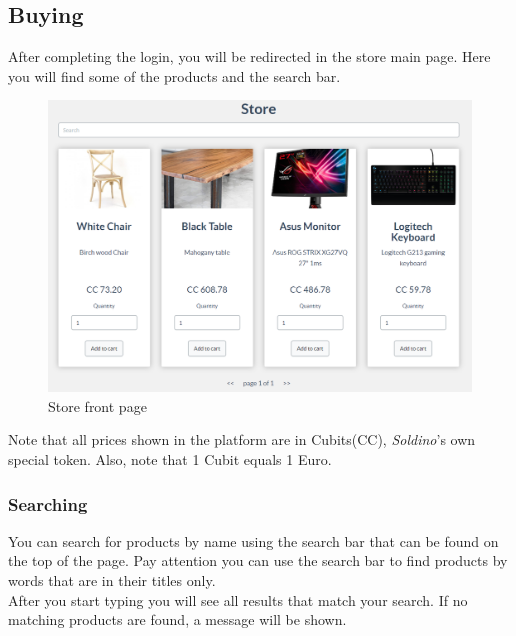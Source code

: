 	\subsection{Buying}
	After completing the login, you will be redirected in the store main page. 
	Here you will find some of the products and the search bar.
	\begin{figure}[H]
		\includegraphics[width=15cm]{res/images/store_main_page.png}
		\centering
		\caption{Store front page}
	\end{figure}
	\noindent Note that all prices shown in the platform are in Cubits\glosp (CC\glo), 
	\textit{Soldino}'s own special token. Also, note that 1 Cubit equals 1 Euro.
		\subsubsection{Searching}
		You can search for products by name using the search bar that can be 
		found on the top of the page. Pay attention you can use the search bar 
		to find products by words that are in their titles only. \\
		After you start typing you will see 
		all results that match your search. If no matching products are 
		found, a message will be shown.
%		
